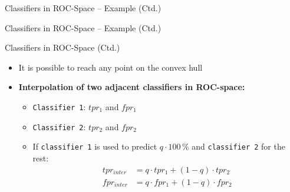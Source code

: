 \begin{frame}{Classifiers in ROC-Space -- Example (Ctd.)}{}
	\vspace*{-2mm}
	\begin{minipage}{0.24\textwidth}
		
	\end{minipage}
	\hfill
	\begin{minipage}{0.24\textwidth}
		
	\end{minipage}
	\hfill
	\begin{minipage}{0.24\textwidth}
		
	\end{minipage}
	\hfill
	\begin{minipage}{0.24\textwidth}
		
	\end{minipage}
\end{frame}


\begin{frame}{Classifiers in ROC-Space -- Example (Ctd.)}{}
\end{frame}


\begin{frame}{Classifiers in ROC-Space (Ctd.)}{}
	\begin{itemize}
		\item It is possible to reach any point on the convex hull
		\item \textbf{Interpolation of two adjacent classifiers in ROC-space:}
		\begin{itemize}
			\item \texttt{Classifier 1}: $tpr_1$ and $fpr_1$
			\item \texttt{Classifier 2}: $tpr_2$ and $fpr_2$
			\item If \texttt{classifier 1} is used to predict $q \cdot 100\,\%$ and \texttt{classifier 2} for the rest:
			\begin{align*}
				tpr_{inter} &= q \cdot tpr_1 + (1 - q) \cdot tpr_2 \\[3mm]
				fpr_{inter} &= q \cdot fpr_1 + (1 - q) \cdot fpr_2 \\
			\end{align*}
		\end{itemize}
	\end{itemize}
\end{frame}



